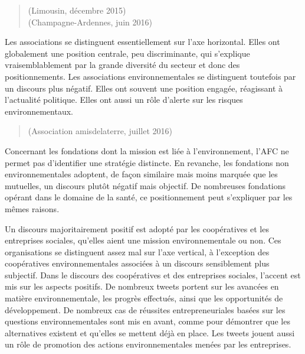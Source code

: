             \begin{quotation}
                 (\cress Limousin, décembre 2015) \\
                 (\cress Champagne-Ardennes, juin 2016)
            \end{quotation}

            Les associations se distinguent essentiellement sur l’axe horizontal. Elles ont globalement une position centrale, peu discriminante, qui s’explique vraisemblablement par la grande diversité du secteur et donc des positionnements. Les associations environnementales se distinguent toutefois par un discours plus négatif. Elles ont souvent une position engagée, réagissant à l’actualité politique. Elles ont aussi un rôle d’alerte sur les risques environnementaux.

            \begin{quotation}
                 (Association amisdelaterre, juillet 2016)
            \end{quotation}

            Concernant les fondations dont la mission est liée à l’environnement, l’AFC ne permet pas d’identifier une stratégie distincte. En revanche, les fondations non environnementales adoptent, de façon similaire mais moins marquée que les mutuelles, un discours plutôt négatif mais objectif. De nombreuses fondations opérant dans le domaine de la santé, ce positionnement peut s’expliquer par les mêmes raisons.

            Un discours majoritairement positif est adopté par les coopératives et les entreprises sociales, qu’elles aient une mission environnementale ou non. Ces organisations se distinguent assez mal sur l’axe vertical, à l’exception des coopératives environnementales associées à un discours sensiblement plus subjectif. Dans le discours des coopératives et des entreprises sociales, l’accent est mis sur les aspects positifs. De nombreux tweets portent sur les avancées en matière environnementale, les progrès effectués, ainsi que les opportunités de développement. De nombreux cas de réussites entrepreneuriales basées sur les questions environnementales sont mis en avant, comme pour démontrer que les alternatives existent et qu’elles se mettent déjà en place. Les tweets jouent aussi un rôle de promotion des actions environnementales menées par les entreprises.

